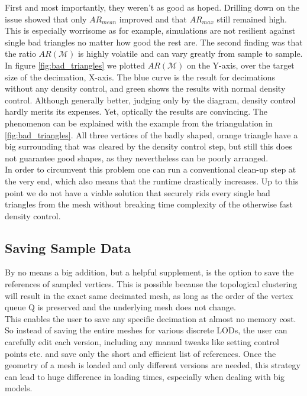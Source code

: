 First and most importantly, they weren't as good as hoped.
Drilling down on the issue showed that only $AR_{mean}$ improved and that $AR_{max}$ still remained high.
This is especially worrisome as for example, simulations are not resilient against single bad triangles no matter how good the rest are.
The second finding was that the ratio $AR(\mathcal{M})$ is highly volatile and can vary greatly from sample to sample.\\
In figure \ref{fig:bad_triangles} we plotted $AR(\mathcal{M})$ on the Y-axis, over the target size of the decimation, X-axis.
The blue curve is the result for decimations without any density control, and green shows the results with normal density control.
Although generally better, judging only by the diagram, density control hardly merits its expenses.
Yet, optically the results are convincing.
The phenomenon can be explained with the example from the triangulation in \ref{fig:bad_triangles}.
All three vertices of the badly shaped, orange triangle have a big surrounding that was cleared by the density control step, but still this does not guarantee good shapes, as they nevertheless can be poorly arranged.\\
In order to circumvent this problem one can run a conventional clean-up step at the very end, which also means that the runtime drastically increases.
Up to this point we do not have a viable solution that securely rids every single bad triangles from the mesh without breaking time complexity of the otherwise fast density control.


\subsection{Saving Sample Data}
\label{topstoc123}

By no means a big addition, but a helpful supplement, is the option to save the references of sampled vertices.
This is possible because the topological clustering will result in the exact same decimated mesh, as long as the order of the vertex queue $\mathrm{Q}$ is preserved and the underlying mesh does not change.\\
This enables the user to save any specific decimation at almost no memory cost.
So instead of saving the entire meshes for various discrete LODs, the user can carefully edit each version, including any manual tweaks like setting control points etc. and save only the short and efficient list of references.
Once the geometry of a mesh is loaded and only different versions are needed, this strategy can lead to huge difference in loading times, especially when dealing with big models.


